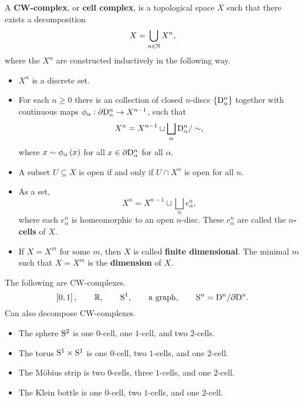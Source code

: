 \begin{definition*}
A \textbf{CW-complex}, or \textbf{cell complex}, is a topological space $ X $ such that there exists a decomposition
$$ X = \bigcup_{n \in \NN} X^n, $$
where the $ X^n $ are constructed inductively in the following way.
\begin{itemize}
\item $ X^n $ is a discrete set.
\item For each $ n \ge 0 $ there is an collection of closed $ n $-discs $ \cbr{\D_\alpha^n} $ together with continuous maps $ \phi_\alpha : \partial \D_\alpha^n \to X^{n - 1} $, such that
$$ X^n = X^{n - 1} \sqcup \bigsqcup_\alpha \D_\alpha^n / \sim, $$
where $ x \sim \phi_\alpha\br{x} $ for all $ x \in \partial \D_\alpha^n $ for all $ \alpha $.
\item A subset $ U \subseteq X $ is open if and only if $ U \cap X^n $ is open for all $ n $.
\end{itemize}
\end{definition*}

\pagebreak

\begin{remark*}
\hfill
\begin{itemize}
\item As a set,
$$ X^n = X^{n - 1} \sqcup \bigsqcup_\alpha e_\alpha^n, $$
where each $ e_\alpha^n $ is homeomorphic to an open $ n $-disc. These $ e_\alpha^n $ are called the \textbf{$ n $-cells} of $ X $.
\item If $ X = X^m $ for some $ m $, then $ X $ is called \textbf{finite dimensional}. The minimal $ m $ such that $ X = X^m $ is the \textbf{dimension} of $ X $.
\end{itemize}
\end{remark*}

\begin{example*}
The following are CW-complexes.
$$ \sbr{0, 1}, \qquad \RR, \qquad \S^1, \qquad \text{a graph}, \qquad \S^n = \D^n / \partial \D^n. $$
Can also decompose CW-complexes.
\begin{itemize}
\item The sphere $ \S^2 $ is one $ 0 $-cell, one $ 1 $-cell, and two $ 2 $-cells.
\item The torus $ \S^1 \times \S^1 $ is one $ 0 $-cell, two $ 1 $-cells, and one $ 2 $-cell.
\item The M\"obius strip is two $ 0 $-cells, three $ 1 $-cells, and one $ 2 $-cell.
\item The Klein bottle is one $ 0 $-cell, two $ 1 $-cells, and one $ 2 $-cell.
\end{itemize}
\end{example*}

